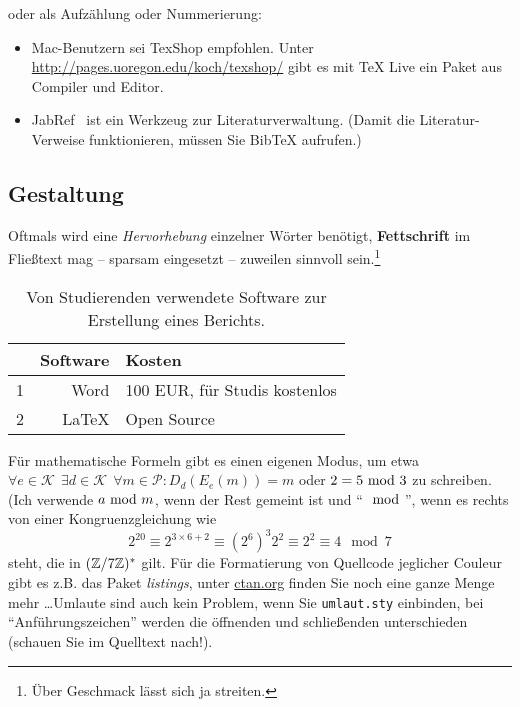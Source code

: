 
{\Large
oder als Aufzählung oder Nummerierung:
}
{\small
\begin{itemize}
\item Mac-Benutzern sei TexShop empfohlen. Unter \url{http://pages.uoregon.edu/koch/texshop/} gibt es mit TeX Live ein Paket aus Compiler und Editor.

\item JabRef~\cite{JabRefOnlineDoku} ist ein Werkzeug zur Literaturverwaltung. (Damit die Literatur-Verweise funktionieren, müssen Sie BibTeX aufrufen.)
\end{itemize}
}

\subsection{Gestaltung}
Oftmals wird eine 
\emph{Hervorhebung} 
einzelner Wörter benötigt, 
\textbf{Fettschrift}
im Fließtext mag -- sparsam eingesetzt --
zuweilen sinnvoll sein.\footnote{Über Geschmack lässt sich ja streiten.}

\begin{table}[hb]
\begin{center}
\begin{tabular}{c||r|l}
  & \textbf{Software}	& \textbf{Kosten} \\  
  \hline
  1 & Word & 100 EUR, für Studis kostenlos \\
  \hline
  2 & \LaTeX & Open Source \\
  \hline
\end{tabular}
\end{center}
\caption{Von Studierenden verwendete Software zur Erstellung eines Berichts.} 
\label{testTabelle}
\end{table}

Für mathematische Formeln gibt es einen eigenen Modus, um etwa $\forall e \in
\mathcal{K} \: \: \exists d \in \mathcal{K} \: \: \forall m \in \mathcal{P}:
D_d(E_e(m)) = m$
oder $2 = 5 \!\!\mod 3$ zu schreiben. (Ich verwende $a \!\!\mod m$, wenn der Rest
gemeint ist und ``$\mod$'', wenn es rechts von einer Kongruenzgleichung wie \[
  2^{20}\equiv 2^{3\times6+2}\equiv (2^6)^3 2^2\equiv 2^2 \equiv 4 \mod 7
\] steht, die in $(\mathbb{Z}/7\mathbb{Z})^*$ gilt.
Für die Formatierung von Quellcode jeglicher Couleur gibt es z.B. das Paket
\emph{listings}, unter \url{ctan.org} finden Sie noch eine ganze Menge mehr
\ldots Umlaute sind auch kein Problem, wenn Sie \verb|umlaut.sty| einbinden, bei
``Anführungszeichen'' werden die öffnenden und schließenden unterschieden
(schauen Sie im Quelltext nach!).

